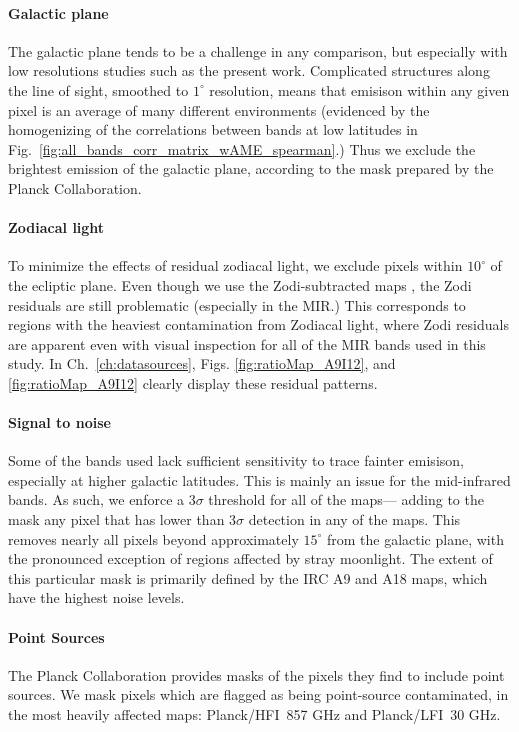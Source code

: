         \paragraph{Galactic plane}
          The galactic plane tends to be a challenge in any comparison, but especially with low resolutions studies such as the present work. Complicated structures along the line of sight, smoothed to $1^{\circ}$ resolution, means that emisison within any given pixel is an average of many different environments (evidenced by the homogenizing of the correlations between bands at low latitudes in Fig.~\ref{fig:all_bands_corr_matrix_wAME_spearman}.) Thus we exclude the brightest emission of the galactic plane, according to the mask prepared by the Planck Collaboration.

        \paragraph{Zodiacal light}
          To minimize the effects of residual zodiacal light, we exclude pixels within $10^{\circ}$ of the ecliptic plane.  Even though we use the Zodi-subtracted maps \citep{kelsall98, kondo16, ootsubo16}, the Zodi residuals are still problematic (especially in the MIR.) This corresponds to regions with the heaviest contamination from Zodiacal light, where Zodi residuals are apparent even with visual inspection for all of the MIR bands used in this study. In Ch.~\ref{ch:datasources}, Figs. \ref{fig:ratioMap_A9I12}, and \ref{fig:ratioMap_A9I12} clearly display these residual patterns.

        \paragraph{Signal to noise}
          Some of the bands used lack sufficient sensitivity to trace fainter emisison, especially at higher galactic latitudes. This is mainly an issue for the mid-infrared bands. As such, we enforce a 3$\sigma$ threshold for all of the maps--- adding to the mask any pixel that has lower than 3$\sigma$ detection in any of the maps. This removes nearly all pixels beyond approximately $15^{\circ}$ from the galactic plane, with the pronounced exception of regions affected by stray moonlight. The extent of this particular mask is primarily defined by the IRC A9 and A18 maps, which have the highest noise levels.

       \paragraph{Point Sources}
         The Planck Collaboration provides masks of the pixels they find to include point sources. We mask pixels which are flagged as being point-source contaminated, in the most heavily affected maps: Planck/HFI~857 GHz and Planck/LFI~30 GHz.

